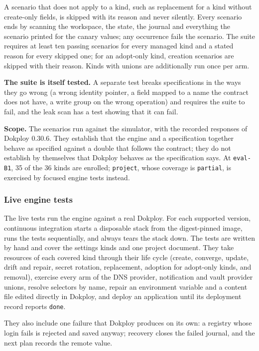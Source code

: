 A scenario that does not apply to a kind, such as replacement for a kind without create-only fields,
is skipped with its reason and never silently. Every scenario ends by scanning the workspace, the
state, the journal and everything the scenario printed for the canary values; any occurrence fails
the scenario. The suite requires at least ten passing scenarios for every managed kind and a stated
reason for every skipped one; for an adopt-only kind, creation scenarios are skipped with their reason.
Kinds with unions are additionally run once per arm.

\textbf{The suite is itself tested.} A separate test breaks specifications in the ways they go wrong (a
wrong identity pointer, a field mapped to a name the contract does not have, a write group on the
wrong operation) and requires the suite to fail, and the leak scan has a test showing that it can
fail.

\textbf{Scope.} The scenarios run against the simulator, with the recorded responses of Dokploy 0.30.6.
They establish that the engine and a specification together behave as specified against a double
that follows the contract; they do not establish by themselves that Dokploy behaves as the specification says.
At \texttt{eval-B1}, 35 of the 36 kinds are enrolled; \texttt{project}, whose coverage is \texttt{partial}, is exercised
by focused engine tests instead.

\subsubsection*{Live engine tests}

The live tests run the engine against a real Dokploy. For each supported version, continuous
integration starts a disposable stack from the digest-pinned image, runs the tests sequentially, and
always tears the stack down. The tests are written by hand and cover the settings kinds and one
project document. They take resources of each covered kind through their life cycle (create, converge,
update, drift and repair, secret rotation, replacement, adoption for adopt-only kinds, and removal),
exercise every arm of the DNS provider, notification and vault provider unions, resolve selectors by
name, repair an environment variable and a content file edited directly in Dokploy, and deploy an
application until its deployment record reports \texttt{done}.

They also include one failure that Dokploy produces on its own: a registry whose login fails is
rejected and saved anyway; recovery closes the failed journal, and the next plan records the remote
value.

